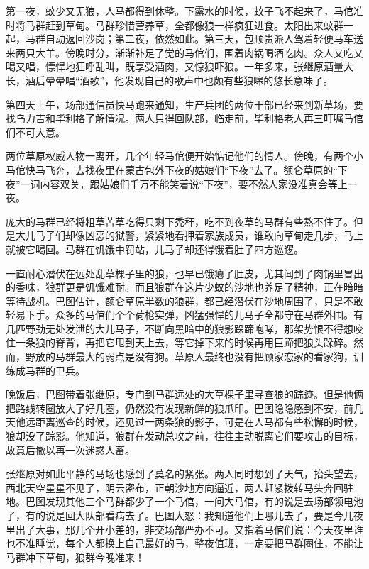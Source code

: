\par 第一夜，蚊少又无狼，人马都得到休整。下露水的时候，蚊子飞不起来了，马倌准时将马群赶到草甸。马群珍惜营养草，全都像狼一样疯狂进食。太阳出来蚊群一起，马群自动返回沙岗；第二夜，依然如此。第三天，包顺贵派人驾着轻便马车送来两只大羊。傍晚时分，渐渐补足了觉的马倌们，围着肉锅喝酒吃肉。众人又吃又喝又唱，慓悍地狂呼乱叫，既享受酒肉，又惊狼吓狼。一年多来，张继原酒量大长，酒后晕晕唱“酒歌”，他发现自己的歌声中也颇有些狼嗥的悠长意味了。
\par 第四天上午，场部通信员快马跑来通知，生产兵团的两位干部已经来到新草场，要找乌力吉和毕利格了解情况。两人只得回队部，临走前，毕利格老人再三叮嘱马倌们不可大意。
\par 两位草原权威人物一离开，几个年轻马倌便开始惦记他们的情人。傍晚，有两个小马倌快马飞奔，去找夜里在蒙古包外下夜的姑娘们“下夜”去了。额仑草原的“下夜”一词内容双关，跟姑娘们千万不能笑着说“下夜”，要不然人家没准真会等上一夜。
\par 庞大的马群已经将粗草苦草吃得只剩下秃秆，吃不到夜草的马群有些熬不住了。但是大儿马子们却像凶恶的狱警，紧紧地看押着家族成员，谁敢向草甸走几步，马上就被它喝回。马群在饥饿中罚站，儿马子却还得饿着肚子四方巡逻。
\par 一直耐心潜伏在远处乱草棵子里的狼，也早已饿瘪了肚皮，尤其闻到了肉锅里冒出的香味，狼群更是饥饿难耐。而且狼群在这片少蚊的沙地也养足了精神，正在暗暗等待战机。巴图估计，额仑草原半数的狼群，都已经潜伏在沙地周围了，只是不敢轻易下手。众多的马倌们个个荷枪实弹，凶猛强悍的儿马子全都守在马群外围。有几匹野劲无处发泄的大儿马子，不断向黑暗中的狼影跺蹄咆哮，那架势恨不得想咬住一条狼的脊背，再把它甩到天上去，等它掉下来的时候再用巨蹄把狼头跺碎。然而，野放的马群最大的弱点是没有狗。草原人最终也没有把顾家恋家的看家狗，训练成马群的卫兵。
\par 晚饭后，巴图带着张继原，专门到马群远处的大草棵子里寻查狼的踪迹。但是他俩把路线转圈放大了好几圈，仍然没有发现新鲜的狼爪印。巴图隐隐感到不安，前几天他远距离巡查的时候，还见过一两条狼的影子，可是在人马都有些松懈的时候，狼却没了踪影。他知道，狼群在发动总攻之前，往往主动脱离它们要攻击的目标，故意后撤以再一次迷惑人畜。
\par 张继原对如此平静的马场也感到了莫名的紧张。两人同时想到了天气，抬头望去，西北天空星星不见了，阴云密布，正朝沙地方向逼近，两人赶紧拨转马头奔回驻地。巴图发现其他三个马群都少了一个马倌，一问大马倌，有的说是去场部领电池了，有的说是回大队部看病去了。巴图大怒：我知道他们上哪儿去了，要是今儿夜里出了大事，那几个开小差的，非交场部严办不可。又指着马倌们说：今天夜里谁也不准睡觉，每个人都换上自己最好的马，整夜值班，一定要把马群圈住，不能让马群冲下草甸，狼群今晚准来！
